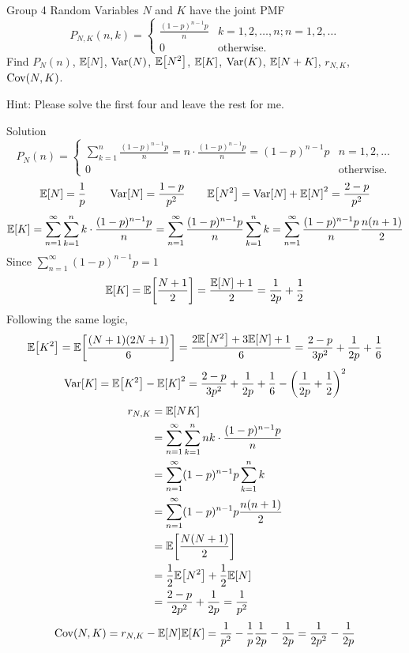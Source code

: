 \documentclass{article}
\begin{document}
\begin{problem}
    {Group 4}
    Random Variables $N$ and $K$ have the joint PMF
    \[
    P_{N,K}(n,k)={
        \begin{cases}
            \frac{(1-p)^{n-1}p}{n} & k=1,2,\ldots,n; n=1,2,\ldots\\
            0 & \text{otherwise.}
        \end{cases}
    }
    \]
    Find $P_N(n)$, $\E{N}$, $\mathop{\mathrm{Var}}\nolimits(N)$, $\E{N^2}$, $\E{K}$, $\mathop{\mathrm{Var}}\nolimits(K)$, $\E{N+K}$, $r_{N,K}$, $\mathop{\mathrm{Cov}}\nolimits(N,K)$.
    \begin{solution}
        {Hint:}
        Please solve the first four and leave the rest for me.
    \end{solution}
\end{problem}

\begin{solution}
    {Solution}
    \[
    P_N(n)={
        \begin{cases}
            \sum_{k=1}^{n}\frac{(1-p)^{n-1}p}{n}=n\cdot\frac{(1-p)^{n-1}p}{n}=(1-p)^{n-1}p & n=1,2,\ldots\\
            0 & \text{otherwise.}
        \end{cases}
    }
    \]
    \[
    \E{N} = \frac{1}{p} \qquad \Var[N] = \frac{1-p}{p^2} \qquad \E{N^2} = \Var[N] + \E{N}^2 = \frac{2-p}{p^2}
    \]
    \[
    \E{K} = \sum_{n=1}^{\infty}\sum_{k=1}^{n}k\cdot\frac{(1-p)^{n-1}p}{n} = \sum_{n=1}^{\infty}\frac{(1-p)^{n-1}p}{n}\sum_{k=1}^{n}k = \sum_{n=1}^{\infty}\frac{(1-p)^{n-1}p}{n}\frac{n(n+1)}{2}
    \]
    Since $\sum_{n=1}^{\infty}(1-p)^{n-1}p=1$
    \[
        \E{K} = \E{\frac{N+1}{2}} = \frac{\E{N}+1}{2} = \frac{1}{2p}+\frac{1}{2}
    \]
    Following the same logic,
    \[
    \E{K^2} = \E{\frac{(N+1)(2N+1)}{6}}=\frac{2\E{N^2}+3\E{N}+1}{6}= \frac{2-p}{3p^2}+\frac{1}{2p}+\frac{1}{6}
    \]
    \[
    \Var[K] = \E{K^2}-\E{K}^2 = \frac{2-p}{3p^2}+\frac{1}{2p}+\frac{1}{6}-\left(\frac{1}{2p}+\frac{1}{2}\right)^2
    \]
    \begin{align*}
        r_{N,K}
        &= \E{NK} \\
        &= \sum_{n=1}^{\infty}\sum_{k=1}^{n}nk\cdot\frac{(1-p)^{n-1}p}{n} \\
        &= \sum_{n=1}^{\infty}(1-p)^{n-1}p\sum_{k=1}^{n}k \\
        &= \sum_{n=1}^{\infty}(1-p)^{n-1}p\frac{n(n+1)}{2} \\
        &= \E{\frac{N(N+1)}{2}} \\
        &= \frac{1}{2}\E{N^2}+\frac{1}{2}\E{N} \\
        &= \frac{2-p}{2p^2}+\frac{1}{2p} = \frac{1}{p^2}
    \end{align*}
    \[
    \Cov(N,K) = r_{N,K}-\E{N}\E{K} = \frac{1}{p^2}-\frac{1}{p}\frac{1}{2p}-\frac{1}{2p} = \frac{1}{2p^2}-\frac{1}{2p}
    \]
\end{solution}
\end{document}
